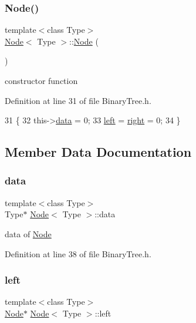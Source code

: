 \subsubsection{\texorpdfstring{Node()}{Node()}\hspace{0.1cm}{\footnotesize\ttfamily [2/2]}}
{\footnotesize\ttfamily template$<$class Type$>$ \\
\hyperlink{class_node}{Node}$<$ Type $>$\+::\hyperlink{class_node}{Node} (\begin{DoxyParamCaption}{ }\end{DoxyParamCaption})\hspace{0.3cm}{\ttfamily [inline]}}

constructor function 

Definition at line 31 of file Binary\+Tree.\+h.


\begin{DoxyCode}
31           \{
32         this->\hyperlink{class_node_a8b322cc3cc17b752eb77533493713ddd}{data} = 0;
33         \hyperlink{class_node_abb08a8b3137dd8fc8874348a439e01b4}{left} = \hyperlink{class_node_a34452c0684d3cb1590406ad201b43e65}{right} = 0;
34     \}
\end{DoxyCode}


\subsection{Member Data Documentation}
\mbox{\label{class_node_a8b322cc3cc17b752eb77533493713ddd}} 
\subsubsection{\texorpdfstring{data}{data}}
{\footnotesize\ttfamily template$<$class Type$>$ \\
Type$\ast$ \hyperlink{class_node}{Node}$<$ Type $>$\+::data}

data of \hyperlink{class_node}{Node} 

Definition at line 38 of file Binary\+Tree.\+h.

\mbox{\label{class_node_abb08a8b3137dd8fc8874348a439e01b4}} 
\subsubsection{\texorpdfstring{left}{left}}
{\footnotesize\ttfamily template$<$class Type$>$ \\
\hyperlink{class_node}{Node}$\ast$ \hyperlink{class_node}{Node}$<$ Type $>$\+::left}

